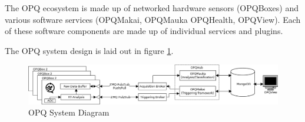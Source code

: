 The OPQ ecosystem is made up of networked hardware sensors (OPQBoxes) and various software services (OPQMakai, OPQMauka OPQHealth, OPQView). Each of these software components are made up of individual services and plugins.

The OPQ system design is laid out in figure \ref{fig:opq-system}.

\begin{figure}
	\centering
	\includegraphics[width=\linewidth]{figures/system-diagram.png}
	\caption{OPQ System Diagram}\label{fig:opq-system}
\end{figure}
%
%
%
%
%
